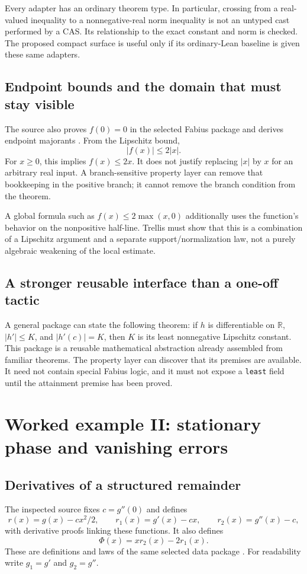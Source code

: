 \documentclass[11pt,a4paper]{article}
\theoremstyle{definition}
\theoremstyle{remark}
\newcommand{\code}[1]{\texttt{#1}}
\newcommand{\R}{\mathbb R}
\begin{document}
Every adapter has an ordinary theorem type. In particular, crossing from a real-valued inequality to a nonnegative-real norm inequality is not an untyped cast performed by a CAS. Its relationship to the exact constant and norm is checked. The proposed compact surface is useful only if its ordinary-Lean baseline is given these same adapters.

\subsection{Endpoint bounds and the domain that must stay visible}
The source also proves $f(0)=0$ in the selected Fabius package and derives endpoint majorants \cite{regularity}. From the Lipschitz bound,
\[
 |f(x)|\le2|x|.
\]
For $x\ge0$, this implies $f(x)\le2x$. It does not justify replacing $|x|$ by $x$ for an arbitrary real input. A branch-sensitive property layer can remove that bookkeeping in the positive branch; it cannot remove the branch condition from the theorem.

A global formula such as $f(x)\le2\max(x,0)$ additionally uses the function's behavior on the nonpositive half-line. Trellis must show that this is a combination of a Lipschitz argument and a separate support/normalization law, not a purely algebraic weakening of the local estimate.

\subsection{A stronger reusable interface than a one-off tactic}
A general package can state the following theorem: if $h$ is differentiable on $\R$, $|h'|\le K$, and $|h'(c)|=K$, then $K$ is its least nonnegative Lipschitz constant. This package is a reusable mathematical abstraction already assembled from familiar theorems. The property layer can discover that its premises are available. It need not contain special Fabius logic, and it must not expose a \code{least} field until the attainment premise has been proved.

\section{Worked example II: stationary phase and vanishing errors}
\label{sec:stationary}

\subsection{Derivatives of a structured remainder}
The inspected source fixes $c=g''(0)$ and defines
\[
 r(x)=g(x)-cx^2/2,\qquad r_1(x)=g'(x)-cx,\qquad
 r_2(x)=g''(x)-c,
\]
with derivative proofs linking these functions. It also defines
\[
 \Phi(x)=xr_2(x)-2r_1(x).
\]
These are definitions and laws of the same selected data package \cite{spTaylor}. For readability write $g_1=g'$ and $g_2=g''$.
\end{document}
